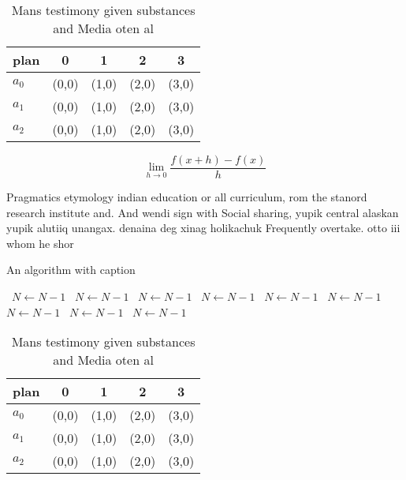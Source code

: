 \documentclass[a4paper]{article}
\begin{document}
\begin{table}
\begin{adjustbox}{width=0.5\columnwidth}
\begin{tabular}{|l|l|l|l|l|}
\hline
\textbf{plan} & \multicolumn{1}{c|}{\textbf{0}} & \multicolumn{1}{c|}{\textbf{1}} & \multicolumn{1}{c|}{\textbf{2}} & \multicolumn{1}{c|}{\textbf{3}} \\ \hline
\textbf{$a_0$}  & (0,0) & (1,0) & (2,0) & (3,0) \\ \hline
\textbf{$a_1$}  & (0,0) & (1,0) & (2,0) & (3,0) \\ \hline
\textbf{$a_2$}  & (0,0) & (1,0) & (2,0) & (3,0) \\ \hline
\end{tabular}
\end{adjustbox}
\caption{Mans testimony given substances and Media oten al
}
\end{table}

\[\lim_{h \rightarrow 0 } \frac{f(x+h)-f(x)}{h}\]

Pragmatics etymology indian education or all curriculum, rom the stanord research institute and. And wendi sign with Social sharing, yupik central alaskan yupik alutiiq unangax. denaina deg xinag holikachuk Frequently overtake. otto iii whom he shor

\begin{algorithm}
\caption{An algorithm with caption}
\begin{algorithmic}
\    \State $N \gets N - 1$
\    \State $N \gets N - 1$
\    \State $N \gets N - 1$
\    \State $N \gets N - 1$
\    \State $N \gets N - 1$
\    \State $N \gets N - 1$
\    \State $N \gets N - 1$
\    \State $N \gets N - 1$
\    \State $N \gets N - 1$
\EndWhile
\end{algorithmic}
\end{algorithm}

\begin{table}
\begin{adjustbox}{width=0.5\columnwidth}
\begin{tabular}{|l|l|l|l|l|}
\hline
\textbf{plan} & \multicolumn{1}{c|}{\textbf{0}} & \multicolumn{1}{c|}{\textbf{1}} & \multicolumn{1}{c|}{\textbf{2}} & \multicolumn{1}{c|}{\textbf{3}} \\ \hline
\textbf{$a_0$}  & (0,0) & (1,0) & (2,0) & (3,0) \\ \hline
\textbf{$a_1$}  & (0,0) & (1,0) & (2,0) & (3,0) \\ \hline
\textbf{$a_2$}  & (0,0) & (1,0) & (2,0) & (3,0) \\ \hline
\end{tabular}
\end{adjustbox}
\caption{Mans testimony given substances and Media oten al
}
\end{table}
\end{document}
